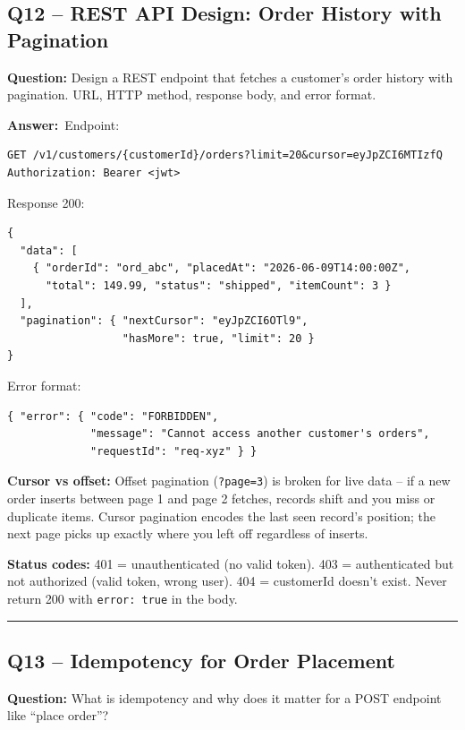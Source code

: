 \documentclass[letterpaper,10pt]{article}
\newlength{\boxwidth}
\newcommand{\questionbox}[1]{%
  \vspace{6pt}%
  \noindent\colorbox{qbg}{%
    \begin{minipage}{\boxwidth}%
      \vspace{3pt}\textbf{\textcolor{nordblue}{Question:}} #1\vspace{3pt}%
    \end{minipage}%
  }\vspace{2pt}%
}
\newcommand{\answerlabel}{\noindent\textbf{\textcolor{answerblue}{Answer:}}~}
\begin{document}
\subsection*{Q12 -- REST API Design: Order History with Pagination}

\questionbox{Design a REST endpoint that fetches a customer's order history with pagination. URL, HTTP method, response body, and error format.}

\answerlabel Endpoint:

\begin{lstlisting}
GET /v1/customers/{customerId}/orders?limit=20&cursor=eyJpZCI6MTIzfQ
Authorization: Bearer <jwt>
\end{lstlisting}

Response 200:

\begin{lstlisting}
{
  "data": [
    { "orderId": "ord_abc", "placedAt": "2026-06-09T14:00:00Z",
      "total": 149.99, "status": "shipped", "itemCount": 3 }
  ],
  "pagination": { "nextCursor": "eyJpZCI6OTl9",
                  "hasMore": true, "limit": 20 }
}
\end{lstlisting}

Error format:

\begin{lstlisting}
{ "error": { "code": "FORBIDDEN",
             "message": "Cannot access another customer's orders",
             "requestId": "req-xyz" } }
\end{lstlisting}

\textbf{Cursor vs offset:} Offset pagination (\texttt{?page=3}) is broken for live data -- if a new order inserts between page 1 and page 2 fetches, records shift and you miss or duplicate items. Cursor pagination encodes the last seen record's position; the next page picks up exactly where you left off regardless of inserts.

\textbf{Status codes:} 401 = unauthenticated (no valid token). 403 = authenticated but not authorized (valid token, wrong user). 404 = customerId doesn't exist. Never return 200 with \texttt{error: true} in the body.

\medskip\rule{\linewidth}{0.2pt}

\subsection*{Q13 -- Idempotency for Order Placement}

\questionbox{What is idempotency and why does it matter for a POST endpoint like ``place order''?}
\end{document}
